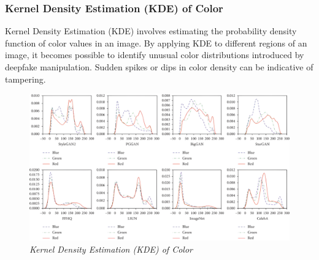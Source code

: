 \subsubsection{Kernel Density Estimation (KDE) of Color}

Kernel Density Estimation (KDE) involves estimating the probability density function of color values in an image. By applying KDE to different regions of an image, it becomes possible to identify unusual color distributions introduced by deepfake manipulation. Sudden spikes or dips in color density can be indicative of tampering.

\begin{figure}[htbp]
    \centering
    \includegraphics[width=5in]{img/KDE.png}
    \caption{\textit{Kernel Density Estimation (KDE) of Color}}
\end{figure}

